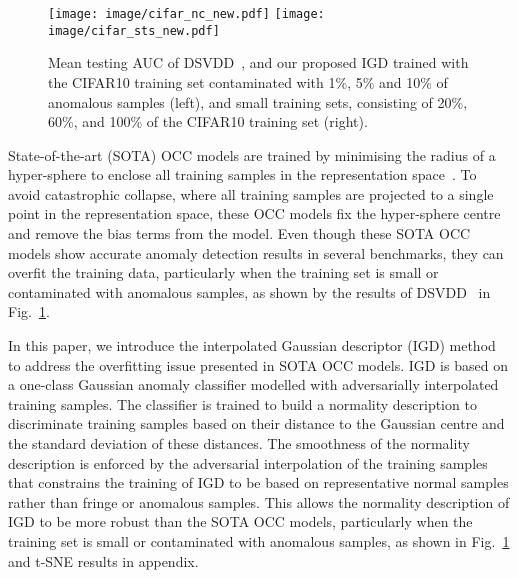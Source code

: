\documentclass[letterpaper]{article} \usepackage{aaai22}  \usepackage{times}  \usepackage{helvet}  \usepackage{courier}  \usepackage[hyphens]{url}  \usepackage{graphicx} \urlstyle{rm} \def\UrlFont{\rm}  \usepackage{natbib}  \usepackage{caption} \DeclareCaptionStyle{ruled}{labelfont=normalfont,labelsep=colon,strut=off} \frenchspacing  \setlength{\pdfpagewidth}{8.5in}  \setlength{\pdfpageheight}{11in}  \usepackage{algorithm}
\begin{document}
\begin{figure}[t!]
  \centering
    \texttt{[image: image/cifar\_nc\_new.pdf]}
    \texttt{[image: image/cifar\_sts\_new.pdf]}
    
\caption{Mean testing AUC of DSVDD~\cite{dsvdd}, and our proposed IGD trained with the CIFAR10 training set contaminated with 1\%, 5\% and 10\% of anomalous samples (left), and small training sets, consisting of 20\%, 60\%, and 100\% of the CIFAR10 training set (right).
}
\label{fig:motivation1}
\end{figure}


















State-of-the-art (SOTA) OCC models are trained by minimising 
the radius of a hyper-sphere to enclose all training samples in the representation space~\cite{dsvdd,perera2019learning,ruff2019deep}. 
To avoid catastrophic collapse, where all training samples are projected to a single point in the representation space, these OCC models fix the hyper-sphere centre and remove the bias terms from the model. 
Even though these SOTA OCC models show accurate anomaly detection results in several benchmarks, 
they can overfit the training data, particularly when the training set is small or contaminated with anomalous samples, as shown by the results of DSVDD~\cite{dsvdd} in Fig.~\ref{fig:motivation1}.




In this paper, we introduce the interpolated Gaussian descriptor (IGD) method to address the overfitting issue presented in SOTA OCC models.
IGD is based on a one-class Gaussian anomaly classifier modelled with adversarially interpolated training samples.
The classifier is trained to
build a normality description to
discriminate training samples based on their distance to the Gaussian centre and the standard deviation of these distances.
The smoothness of the normality description is enforced by the adversarial interpolation of the training samples that constrains the training of IGD to be 
based on representative normal samples rather than fringe or anomalous samples.
This allows the normality description of IGD to be more robust than the SOTA OCC models, particularly when the training set is small or contaminated with anomalous samples, as shown in
Fig.~\ref{fig:motivation1} and t-SNE results in appendix.
\end{document}
